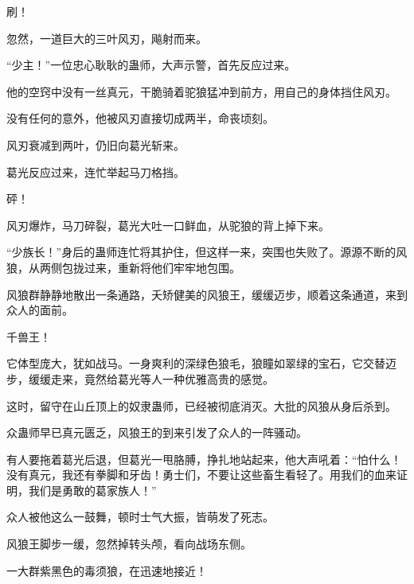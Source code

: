 \begin{this_body}
刷！

忽然，一道巨大的三叶风刃，飚射而来。

“少主！”一位忠心耿耿的蛊师，大声示警，首先反应过来。

他的空窍中没有一丝真元，干脆骑着驼狼猛冲到前方，用自己的身体挡住风刃。

没有任何的意外，他被风刃直接切成两半，命丧顷刻。

风刃衰减到两叶，仍旧向葛光斩来。

葛光反应过来，连忙举起马刀格挡。

砰！

风刃爆炸，马刀碎裂，葛光大吐一口鲜血，从驼狼的背上掉下来。

“少族长！”身后的蛊师连忙将其护住，但这样一来，突围也失败了。源源不断的风狼，从两侧包拢过来，重新将他们牢牢地包围。

风狼群静静地散出一条通路，夭矫健美的风狼王，缓缓迈步，顺着这条通道，来到众人的面前。

千兽王！

它体型庞大，犹如战马。一身爽利的深绿色狼毛，狼瞳如翠绿的宝石，它交替迈步，缓缓走来，竟然给葛光等人一种优雅高贵的感觉。

这时，留守在山丘顶上的奴隶蛊师，已经被彻底消灭。大批的风狼从身后杀到。

众蛊师早已真元匮乏，风狼王的到来引发了众人的一阵骚动。

有人要拖着葛光后退，但葛光一甩胳膊，挣扎地站起来，他大声吼着：“怕什么！没有真元，我还有拳脚和牙齿！勇士们，不要让这些畜生看轻了。用我们的血来证明，我们是勇敢的葛家族人！”

众人被他这么一鼓舞，顿时士气大振，皆萌发了死志。

风狼王脚步一缓，忽然掉转头颅，看向战场东侧。

一大群紫黑色的毒须狼，在迅速地接近！

\end{this_body}

